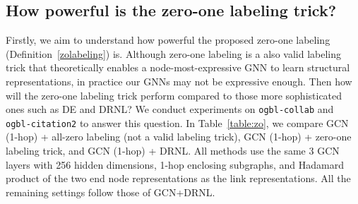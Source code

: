 \documentclass{article}
\begin{document}
\subsection{How powerful is the zero-one labeling trick?}
Firstly, we aim to understand how powerful the proposed zero-one labeling (Definition~\ref{zolabeling}) is. Although zero-one labeling is a also valid labeling trick that theoretically enables a node-most-expressive GNN to learn structural representations, in practice our GNNs may not be expressive enough. Then how will the zero-one labeling trick perform compared to those more sophisticated ones such as DE and DRNL? We conduct experiments on \texttt{ogbl-collab} and \texttt{ogbl-citation2} to answer this question. In Table~\ref{table:zo}, we compare GCN (1-hop) + all-zero labeling (not a valid labeling trick), GCN (1-hop) + zero-one labeling trick, and GCN (1-hop) + DRNL. All methods use the same 3 GCN layers with 256 hidden dimensions, 1-hop enclosing subgraphs, and Hadamard product of the two end node representations as the link representations. All the remaining settings follow those of GCN+DRNL.

\begin{table}[h]
\caption{Ablation study on the power of the zero-one labeling trick.}
\label{table:zo}
\begin{center}
\end{center}
\end{table}
\end{document}
